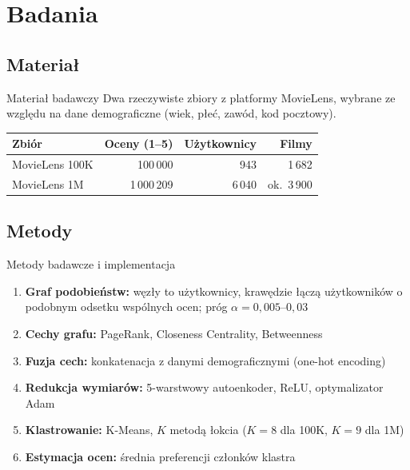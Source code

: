 \documentclass[red]{beamer}
\begin{document}
    \section{Badania}
    \subsection{Materiał}
    \begin{frame}{Materiał badawczy}
        Dwa rzeczywiste zbiory z platformy MovieLens, wybrane ze względu na dane demograficzne (wiek, płeć, zawód, kod pocztowy).
        \medskip
        \begin{center}
            \begin{tabular}{lrrr}
                \textbf{Zbiór} & \textbf{Oceny (1--5)} & \textbf{Użytkownicy} & \textbf{Filmy}\\ \hline
                MovieLens 100K & 100\,000 & 943 & 1\,682\\
                MovieLens 1M & 1\,000\,209 & 6\,040 & ok.\ 3\,900
            \end{tabular}
        \end{center}
    \end{frame}

    \subsection{Metody}
    \begin{frame}{Metody badawcze i implementacja}
        \small
        \begin{enumerate}
            \item \textbf{Graf podobieństw:} węzły to użytkownicy, krawędzie łączą użytkowników o podobnym odsetku wspólnych ocen; próg $\alpha = 0{,}005$--$0{,}03$
            \item \textbf{Cechy grafu:} PageRank, Closeness Centrality, Betweenness
            \item \textbf{Fuzja cech:} konkatenacja z danymi demograficznymi (one-hot encoding)
            \item \textbf{Redukcja wymiarów:} 5-warstwowy autoenkoder, ReLU, optymalizator Adam
            \item \textbf{Klastrowanie:} K-Means, $K$ metodą łokcia ($K=8$ dla 100K, $K=9$ dla 1M)
            \item \textbf{Estymacja ocen:} średnia preferencji członków klastra
        \end{enumerate}
    \end{frame}
\end{document}

